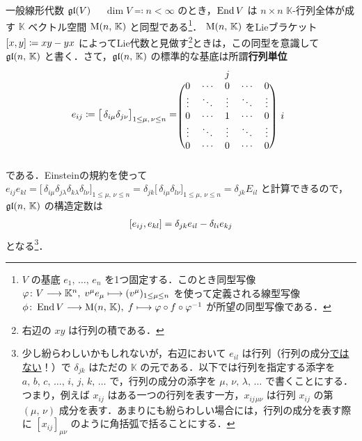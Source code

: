 \documentclass[rep_main]{subfiles}
\begin{document}
\begin{myexample}[label=def:gl-alg]{一般線形代数 $\mathfrak{gl} (V)$}
    　$\dim V \eqqcolon n < \infty$ のとき，$\operatorname{End} V$ は $n \times n$ $\mathbb{K}$-行列全体が成す $\mathbb{K}$ ベクトル空間 $\mathrm{M}(n,\, \mathbb{K})$ と同型である\footnote{$V$ の基底 $e_1,\, \dots,\, e_n$ を1つ固定する．このとき同型写像 $\varphi \colon V \longrightarrow \mathbb{K}^n,\; v^\mu e_\mu \longmapsto (v^\mu)_{1 \le \mu \le n}$ を使って定義される線型写像 $\phi \colon \operatorname{End} V \longrightarrow \mathrm{M}(n,\, \mathbb{K}),\; f \longmapsto \varphi \circ f \circ \varphi^{-1}$ が所望の同型写像である．}．
    $\mathrm{M}(n,\, \mathbb{K})$ をLieブラケット $\comm{x}{y} \coloneqq xy - yx$ によってLie代数と見做す\footnote{右辺の $xy$ は行列の積である．}ときは，この同型を意識して $\mathfrak{gl}(n,\, \mathbb{K})$ と書く．さて，$\mathfrak{gl}(n,\, \mathbb{K})$ の標準的な基底は所謂\textbf{行列単位}
    \begin{align}
        e_{ij} \coloneqq \bigl[\, \delta_{i\mu} \delta_{j\nu} \bigr]_{1 \le \mu,\, \nu \le n} 
        = 
        \begin{blockarray}{cccccc}
            & & j & & \\
            \begin{block}{(ccccc)c}
                0 & \cdots & 0 & \cdots & 0 & \\
                \vdots & \ddots & \vdots & \ddots & \vdots & \\
                0 & \cdots & 1 & \cdots & 0 & i \\
                \vdots & \ddots & \vdots & \ddots & \vdots & \\
                0 & \cdots & 0 & \cdots & 0 & \\
            \end{block}
        \end{blockarray}
    \end{align}
    である．Einsteinの規約を使って $e_{ij} e_{kl} = \bigl[\, \delta_{i\mu} \delta_{j\lambda} \delta_{k \lambda} \delta_{l \nu} \bigr]_{1 \le \mu,\, \nu \le n} = \delta_{jk} \bigl[\, \delta_{i\mu} \delta_{l\nu} \bigr]_{1 \le \mu,\, \nu \le n} = \delta_{jk} E_{il}$ と計算できるので，$\mathfrak{gl}(n,\, \mathbb{K})$ の構造定数は
    \begin{align}
        \comm{e_{ij}}{e_{kl}} = \delta_{jk} e_{il} - \delta_{li} e_{kj}
    \end{align}
    となる\footnote{少し紛らわしいかもしれないが，右辺において $e_{il}$ は行列（行列の成分\underline{ではない}！）で $\delta_{jk}$ はただの $\mathbb{K}$ の元である．以下では行列を指定する添字を $a,\,b,\, c,\, \dots,\, i,\, j,\, k,\, \dots$ で，行列の成分の添字を $\mu,\, \nu,\, \lambda,\, \dots$ で書くことにする．つまり，例えば $x_{ij}$ はある一つの行列を表す一方，$x_{ij}{}_{\mu\nu}$ は行列 $x_{ij}$ の第 $(\mu,\, \nu)$ 成分を表す．あまりにも紛らわしい場合には，行列の成分を表す際に $[x_{ij}]_{\mu\nu}$ のように角括弧で括ることにする．}．
\end{myexample}
\end{document}
